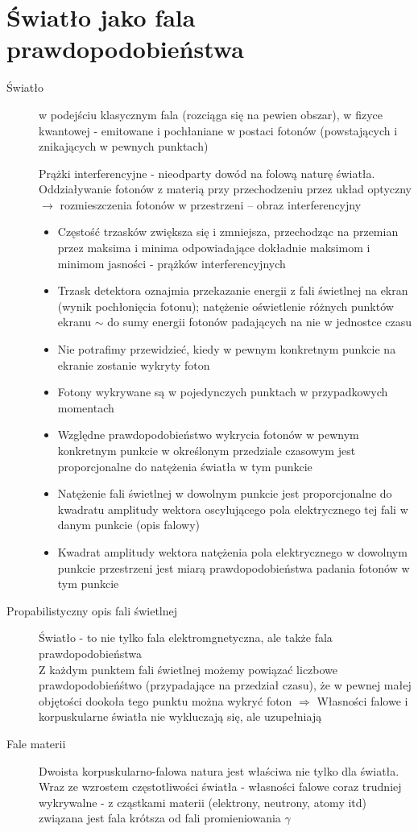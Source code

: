 \documentclass[a4paper,11pt]{article}
\begin{document}
\section{Światło jako fala prawdopodobieństwa}
\begin{description}
\item[Światło] w podejściu klasycznym fala (rozciąga się na pewien obszar), w fizyce kwantowej - emitowane i pochłaniane w postaci fotonów (powstających i znikających w pewnych punktach)

  Prążki interferencyjne - nieodparty dowód na folową naturę światła. Oddziaływanie fotonów z materią przy przechodzeniu przez układ optyczny $\longrightarrow$ rozmieszczenia fotonów w przestrzeni -- obraz interferencyjny
  \begin{itemize}
  \item Częstość trzasków zwiększa się i zmniejsza, przechodząc na przemian przez maksima i minima odpowiadające dokładnie maksimom i minimom jasności - prążków interferencyjnych
  \item Trzask detektora oznajmia przekazanie energii z fali świetlnej na ekran (wynik pochłonięcia fotonu); natężenie oświetlenie różnych punktów ekranu $\sim$ do sumy energii fotonów padających na nie w jednostce czasu 
  \item Nie potrafimy przewidzieć, kiedy w pewnym konkretnym punkcie na ekranie zostanie wykryty foton
  \item Fotony wykrywane są w pojedynczych punktach w przypadkowych momentach
  \item Względne prawdopodobieństwo wykrycia fotonów w pewnym konkretnym punkcie w określonym przedziale czasowym jest proporcjonalne do natężenia światła w tym punkcie
  \item Natężenie fali świetlnej w dowolnym punkcie jest proporcjonalne do kwadratu amplitudy wektora oscylującego pola elektrycznego tej fali w danym punkcie (opis falowy)
  \item Kwadrat amplitudy wektora natężenia pola elektrycznego w dowolnym punkcie przestrzeni jest miarą prawdopodobieństwa padania fotonów w tym punkcie
  \end{itemize}
\item[Propabilistyczny opis fali świetlnej] Światło - to nie tylko fala elektromgnetyczna, ale także fala prawdopodobieństwa\\
  Z każdym punktem fali świetlnej możemy powiązać liczbowe prawdopodobieńśtwo (przypadające na przedział czasu), że w pewnej małej objętości dookoła tego punktu można wykryć foton $\Rightarrow$ Własności falowe i korpuskularne światła nie wykluczają się, ale uzupełniają
\item[Fale materii] Dwoista korpuskularno-falowa natura jest właściwa nie tylko dla światła. Wraz ze wzrostem częstotliwości światła - własności falowe coraz trudniej wykrywalne - z cząstkami materii (elektrony, neutrony, atomy itd) związana jest fala krótsza od fali promieniowania $\gamma$ 


\end{description}
\end{document}

